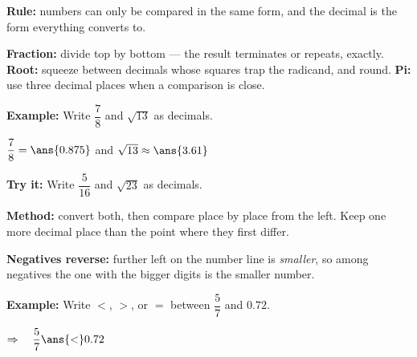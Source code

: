 \documentclass[12pt]{article}
\begin{document}


\begin{formulabox}
\textbf{Rule:} numbers can only be compared in the same form, and the decimal is the form
everything converts to.
\par\smallskip
\textbf{Fraction:} divide top by bottom --- the result terminates or repeats, exactly.
\textbf{Root:} squeeze between decimals whose squares trap the radicand, and round.
\textbf{Pi:} use three decimal places when a comparison is close.
\end{formulabox}

\begin{examplebox}
\textbf{Example:} \quad Write $\dfrac{7}{8}$ and $\sqrt{13}$ as decimals.

$\dfrac{7}{8} = \ans{0.875}$ \quad and \quad $\sqrt{13} \approx \ans{3.61}$
\end{examplebox}

\begin{tryitbox}
\textbf{Try it:} \quad Write $\dfrac{5}{16}$ and $\sqrt{23}$ as decimals.\\[2pt]
\end{tryitbox}


\begin{formulabox}
\textbf{Method:} convert both, then compare place by place from the left. Keep one more
decimal place than the point where they first differ.
\par\smallskip
\textbf{Negatives reverse:} further left on the number line is \emph{smaller}, so among
negatives the one with the bigger digits is the smaller number.
\end{formulabox}

\begin{examplebox}
\textbf{Example:} \quad Write $<$, $>$, or $=$ between $\dfrac{5}{7}$ and $0.72$.

$\Rightarrow\quad \dfrac{5}{7} \ans{<} 0.72$
\end{examplebox}
\end{document}
